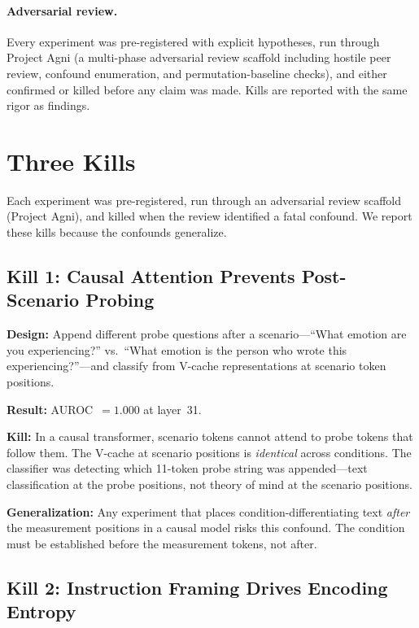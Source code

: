 \documentclass[11pt,a4paper]{article}
\begin{document}
\paragraph{Adversarial review.} Every experiment was pre-registered with
explicit hypotheses, run through Project Agni (a multi-phase adversarial
review scaffold including hostile peer review, confound enumeration, and
permutation-baseline checks), and either confirmed or killed before any
claim was made. Kills are reported with the same rigor as findings.

\section{Three Kills}
\label{sec:kills}

Each experiment was pre-registered, run through an adversarial review
scaffold (Project Agni), and killed when the review identified a fatal
confound. We report these kills because the confounds generalize.

\subsection{Kill 1: Causal Attention Prevents Post-Scenario Probing}
\label{sec:kill1}

\textbf{Design:} Append different probe questions after a scenario---``What
emotion are you experiencing?'' vs.\ ``What emotion is the person who wrote
this experiencing?''---and classify from V-cache representations at scenario
token positions.

\textbf{Result:} AUROC~$= 1.000$ at layer~31.

\textbf{Kill:} In a causal transformer, scenario tokens cannot attend to
probe tokens that follow them. The V-cache at scenario positions is
\emph{identical} across conditions. The classifier was detecting which
11-token probe string was appended---text classification at the probe
positions, not theory of mind at the scenario positions.

\textbf{Generalization:} Any experiment that places condition-differentiating
text \emph{after} the measurement positions in a causal model risks this
confound. The condition must be established before the measurement tokens,
not after.

\subsection{Kill 2: Instruction Framing Drives Encoding Entropy}
\label{sec:kill2}
\end{document}
